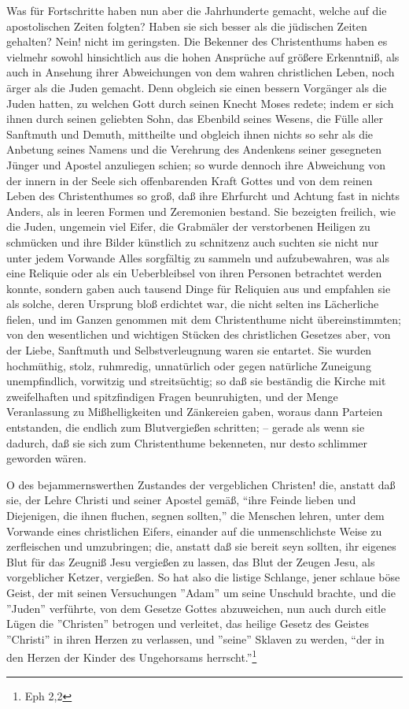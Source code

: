Was für Fortschritte haben nun aber die Jahrhunderte gemacht, welche auf die apostolischen Zeiten folgten? Haben sie sich besser als die jüdischen Zeiten gehalten? Nein! nicht im geringsten. Die Bekenner des Christenthums haben es vielmehr sowohl hinsichtlich aus die hohen Ansprüche auf größere Erkenntniß, als auch in Ansehung ihrer Abweichungen von dem wahren christlichen Leben, noch ärger als die Juden gemacht. Denn obgleich sie einen bessern Vorgänger als die Juden hatten, zu welchen Gott durch seinen Knecht Moses redete; indem er sich ihnen durch seinen geliebten Sohn, das Ebenbild seines Wesens, die Fülle aller Sanftmuth und Demuth, mittheilte und obgleich ihnen nichts so sehr als die Anbetung seines Namens und die Verehrung des Andenkens seiner gesegneten Jünger und Apostel anzuliegen schien; so wurde dennoch ihre Abweichung von der innern in der Seele sich offenbarenden Kraft Gottes und von dem reinen Leben des Christenthumes so groß, daß ihre Ehrfurcht und Achtung fast in nichts Anders, als in leeren Formen und Zeremonien bestand. Sie bezeigten freilich, wie die Juden, ungemein viel Eifer, die Grabmäler der verstorbenen Heiligen zu schmücken und ihre Bilder künstlich zu schnitzenz auch suchten sie nicht nur unter jedem Vorwande Alles sorgfältig zu sammeln und aufzubewahren, was als eine Reliquie oder als ein Ueberbleibsel von ihren Personen betrachtet werden konnte, sondern gaben auch tausend Dinge für Reliquien aus und empfahlen sie als solche, deren Ursprung bloß erdichtet war, die nicht selten ins Lächerliche fielen, und im Ganzen genommen mit dem Christenthume nicht übereinstimmten; von den wesentlichen und wichtigen Stücken des christlichen Gesetzes aber, von der Liebe, Sanftmuth und Selbstverleugnung waren sie entartet. Sie wurden hochmüthig, stolz, ruhmredig, unnatürlich oder gegen natürliche Zuneigung unempfindlich, vorwitzig und streitsüchtig; so daß sie beständig die Kirche mit zweifelhaften und spitzfindigen Fragen beunruhigten, und der Menge Veranlassung zu Mißhelligkeiten und Zänkereien gaben, woraus dann Parteien entstanden, die endlich zum Blutvergießen schritten; -- gerade als wenn sie dadurch, daß sie sich zum Christenthume bekenneten, nur desto schlimmer geworden wären.

O des bejammernswerthen Zustandes der vergeblichen Christen! die, anstatt daß sie, der Lehre Christi und seiner Apostel gemäß, "`ihre Feinde lieben und Diejenigen, die ihnen fluchen, segnen sollten,"' die Menschen lehren, unter dem Vorwande eines christlichen Eifers, einander auf die unmenschlichste Weise zu zerfleischen und umzubringen; die, anstatt daß sie bereit seyn sollten, ihr eigenes Blut für das Zeugniß Jesu vergießen zu lassen, das Blut der Zeugen Jesu, als vorgeblicher Ketzer, vergießen. So hat also die listige Schlange, jener schlaue böse Geist, der mit seinen Versuchungen ''Adam'' um seine Unschuld brachte, und die ''Juden'' verführte, von dem Gesetze Gottes abzuweichen, nun auch durch eitle Lügen die ''Christen'' betrogen und verleitet, das heilige Gesetz des Geistes ''Christi'' in ihren Herzen zu verlassen, und ''seine'' Sklaven zu werden, "`der in den Herzen der Kinder des Ungehorsams herrscht."'\footnote{Eph 2,2}

